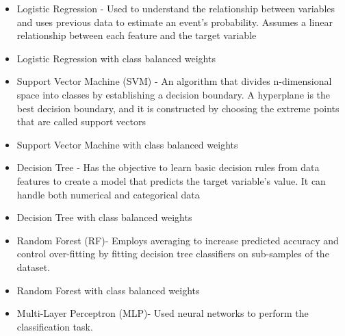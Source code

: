 \begin{itemize}
	\item Logistic Regression - Used to understand the relationship between variables and uses previous data to estimate an event's probability. Assumes a linear relationship between each feature and the target variable
	\item Logistic Regression with class balanced weights
	\item Support Vector Machine (SVM) - An algorithm that divides n-dimensional space into classes by establishing a decision boundary. A hyperplane is the best decision boundary, and it is constructed by choosing the extreme points that are called support vectors
  
  \item Support Vector Machine with class balanced weights
  
  \item Decision Tree - Has the objective to learn basic decision rules from data features to create a model that predicts the target variable's value. It can handle both numerical and categorical data
  
  \item Decision Tree with class balanced weights
  
  \item Random Forest (RF)- Employs averaging to increase predicted accuracy and control over-fitting by fitting decision tree classifiers on sub-samples of the dataset.
  
  \item Random Forest with class balanced weights
  
  \item Multi-Layer Perceptron (MLP)- Used neural networks to perform the classification task.
  
\end{itemize}
